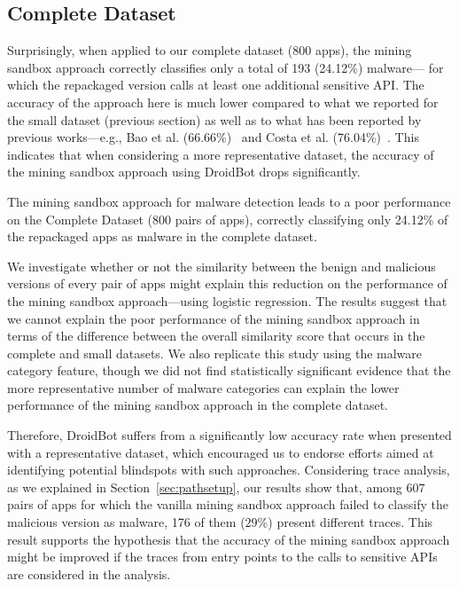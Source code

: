 \subsection{Complete Dataset} 

Surprisingly, when applied to our complete dataset (\num{800} apps), the mining
sandbox approach correctly classifies only a total of \num{193} (\num{24.12}\%) malware---
for which the
repackaged version calls at least one additional sensitive API.
The accuracy of the approach here is much lower compared to what we reported for the
small dataset (previous section) as well as to what has been reported by previous works---e.g.,
Bao et al. (\num{66.66}\%)~\cite{DBLP:conf/wcre/BaoLL18} and Costa et al.
(\num{76.04}\%)~\cite{DBLP:journals/jss/CostaMMSSBNR22}. 
This indicates that when considering a more representative dataset, the accuracy of the mining sandbox
approach using DroidBot drops significantly. 

\begin{obs}{4}{}
  The mining sandbox approach for malware detection
  leads to a poor performance on the Complete Dataset (\num{800} pairs of apps),
  correctly classifying only \num{24.12}\% of the repackaged
  apps as malware in the complete dataset.
\end{obs}

We investigate whether or not the similarity between
the benign and malicious versions of every pair of apps
might explain this reduction on the performance of
the mining sandbox approach---using logistic regression.
The results suggest that we cannot explain the
poor performance of the mining sandbox approach
in terms of the difference between the overall similarity score that occurs in the
complete and small datasets. We also replicate this study using the
malware category feature, though we did not find
statistically significant evidence that the more representative
number of malware categories can explain the lower
performance of the mining sandbox approach in the
complete dataset. 


Therefore, DroidBot suffers from a significantly low accuracy rate when presented with a representative dataset, 
which encouraged us to endorse efforts aimed at identifying potential blindspots with such approaches.
Considering trace analysis, as we explained in Section~\ref{sec:pathsetup},
our results show that, among $607$ pairs of apps for which the vanilla mining
sandbox approach failed to classify the malicious version as malware, \num{176} of them ($29$\%) present different traces.
This result supports the hypothesis that the accuracy of the mining sandbox approach might be improved if the traces
from entry points to the calls to sensitive APIs are considered in the analysis.

